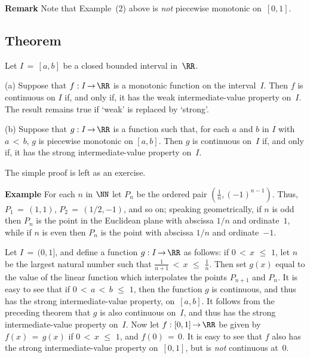 \V

        {\bf Remark} Note that Example~(2) above is {\em not} piecewise monotonic on~$[0,1]$.

\V

            \subsection{\small{\bf Theorem}}
            \label{ThmD25.55A}

\V

        Let $I \,=\, [a,b]$ be a closed bounded interval in~${\RR}$.

\V

        (a) Suppose that $f:I \,{\rightarrow}\, {\RR}$ is a monotonic function on the interval~$I$.
    Then $f$ is continuous on $I$ if, and only if, it has the weak intermediate-value property on~$I$.
    The result remains true if `weak' is replaced by `strong'.

\V

        (b) Suppose that $g:I \,{\rightarrow}\, {\RR}$ is a function such that, for each $a$ and $b$ in $I$ with $a\,<\,b$,
    $g$ is piecewise monotonic on $[a,b]$. Then $g$ is continuous on~$I$ if, and only if, it has the strong intermediate-value property on~$I$.

\V

        The simple proof is left as an exercise. %

\V

        {\bf Example} For each $n$ in ${\NN}$ let $P_{n}$ be the ordered pair ${\displaystyle \left(\frac{1}{n}, (-1)^{n-1}\right)}$.
    Thus, $P_{1} \,=\, (1,1)$, $P_{2} \,=\, (1/2,-1)$, and so on; speaking geometrically,
    if $n$ is odd then $P_{n}$ is the point in the Euclidean plane with abscissa $1/n$ and ordinate~$1$,
    while if $n$ is even then $P_{n}$ is the point with abscissa $1/n$ and ordinate~$-1$.

        Let $I \,=\, (0,1]$, and define a function $g:I \,{\rightarrow}\, {\RR}$ as follows:
    if $0\,<\,x\,\,{\leq}\,\,1$, let $n$ be the largest natural number such that ${\displaystyle \frac{1}{n+1}\,<\,x\,\,{\leq}\,\,\frac{1}{n}}$.
    Then set $g(x)$ equal to the value of the linear function which interpolates the points $P_{n+1}$ and $P_{n}$.
    It is easy to see that if $0\,<\,a\,<\,b\,\,{\leq}\,\,1$, then the function $g$ is continuous, and thus has the strong intermediate-value property, 
    on~$[a,b]$. It follows from the preceding theorem that $g$ is also continuous on~$I$, and thus has the strong intermediate-value property on~$I$.
    Now let $f:[0,1] \,{\rightarrow}\, {\RR}$ be given by $f(x) \,=\, g(x)$ if $0\,<\,x\,\,{\leq}\,\,1$, and $f(0) \,=\, 0$.
    It is easy to see that $f$ also has the strong intermediate-value property on~$[0,1]$, but is {\em not} continuous at~$0$.

